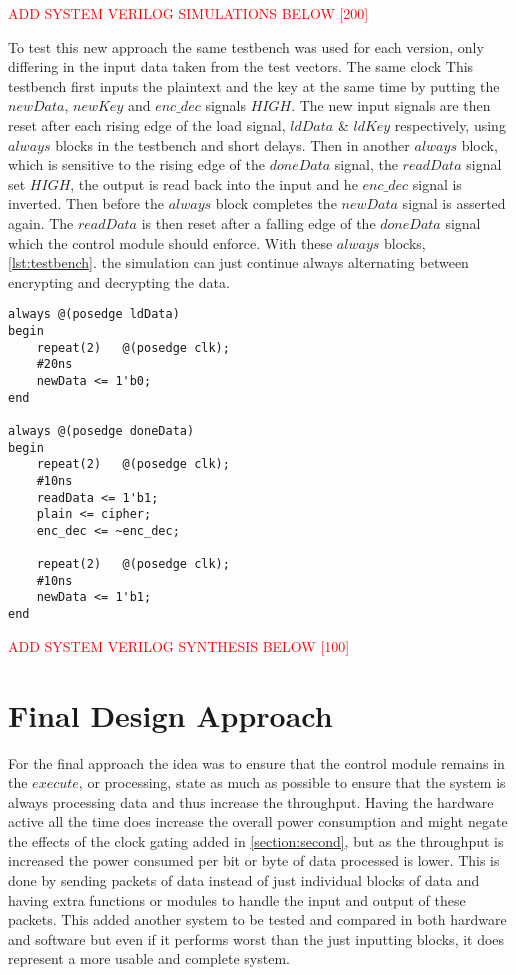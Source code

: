 \documentclass[12pt,twoside,a4paper]{report}
\begin{document}
	\textcolor{red}{ADD SYSTEM VERILOG SIMULATIONS BELOW [200]}
	
	To test this new approach the same testbench was used for each version, only differing in the input data taken from the test vectors. The same clock This testbench first inputs the plaintext and the key at the same time by putting the $newData$, $newKey$ and $enc\_dec$ signals $HIGH$. The new input signals are then reset after each rising edge of the load signal, $ldData$ \& $ldKey$ respectively, using $always$ blocks in the testbench and short delays. Then in another $always$ block, which is sensitive to the rising edge of the $doneData$ signal, the $readData$ signal set $HIGH$, the output is read back into the input and he $enc\_dec$ signal is inverted. Then before the $always$ block completes the $newData$ signal is asserted again. The $readData$ is then reset after a falling edge of the $doneData$ signal which the control module should enforce. With these $always$ blocks, \autoref{lst:testbench}. the simulation can just continue always alternating between encrypting and decrypting the data.

	\begin{minipage}{\linewidth}
	\begin{lstlisting}[label={lst:testbench},caption={The $always$ blocks of the testnches},style=CStyle]
always @(posedge ldData)
begin
	repeat(2)	@(posedge clk);
	#20ns
	newData <= 1'b0;
end

always @(posedge doneData)
begin
	repeat(2)	@(posedge clk);
	#10ns
	readData <= 1'b1;
	plain <= cipher;
	enc_dec <= ~enc_dec;
	
	repeat(2)	@(posedge clk);
	#10ns
	newData <= 1'b1;
end
	\end{lstlisting}
	\end{minipage}
    
	\textcolor{red}{ADD SYSTEM VERILOG SYNTHESIS BELOW [100]}
    
	\chapter{Final Design Approach}
	\label{chapter:FINAL}
	For the final approach the idea was to ensure that the control module remains in the $execute$, or processing, state as much as possible to ensure that the system is always processing data and thus increase the throughput. Having the hardware active all the time does increase the overall power consumption and might negate the effects of the clock gating added in \autoref{section:second}, but as the throughput is increased the power consumed per bit or byte of data processed is lower. This is done by sending packets of data instead of just individual blocks of data and having extra functions or modules to handle the input and output of these packets. This added another system to be tested and compared in both hardware and software but even if it performs worst than the just inputting blocks, it does represent a more usable and complete system.
    
\end{document}
